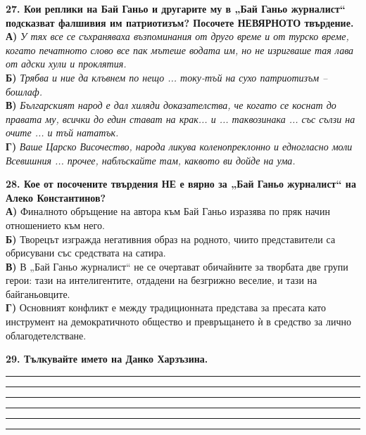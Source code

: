 \documentclass[12pt,a4paper]{article}
\begin{document}
{{{{{{{{{{{{\vspace{0.6cm}

\noindent
\textbf{27. Кои реплики на Бай Ганьо и другарите му в „Бай Ганьо журналист“ подсказват фалшивия им патриотизъм? Посочете НЕВЯРНОТО твърдение.} \\
\textbf{А)} \textit{У тях все се съхраняваха възпоминания от друго време и от турско време, когато печатното слово все пак мътеше водата им, но не изригваше тая лава от адски хули и проклятия.} \\
\textbf{Б)}  \textit{Трябва и ние да клъвнем по нещо ... току-тъй на сухо патриотизъм – бошлаф.} \\
\textbf{В)} \textit{Българският народ е дал хиляди доказателства, че когато се коснат до правата му, всички до един стават на крак... и ... таквозинака ... със сълзи на очите ... и тъй нататък.} \\
\textbf{Г)} \textit{Ваше Царско Височество, народа ликува коленопреклонно и едногласно моли Всевишния ... прочее, наблъскайте там, каквото ви дойде на ума.}

\vspace{0.6cm}

\noindent
\textbf{28. Кое от посочените твърдения НЕ е вярно за „Бай Ганьо журналист“ на Алеко Константинов?} \\
\textbf{А)} Финалното обръщение на автора към Бай Ганьо изразява по пряк начин отношението към него. \\
\textbf{Б)}  Творецът изгражда негативния образ на родното, чиито представители са обрисувани със средствата на сатира. \\
\textbf{В)} В „Бай Ганьо журналист“ не се очертават обичайните за творбата две групи герои: тази на интелигентите, отдадени на безгрижно веселие, и тази на байганьовците. \\
\textbf{Г)} Основният конфликт е между традиционната представа за пресата като инструмент на демократичното общество и превръщането ѝ в средство за лично облагодетелстване.  

\vspace{0.3cm}

\noindent
\textbf{29. Тълкувайте името на Данко Харзъзина.}

\vspace{0.3cm}

\noindent\rule{\linewidth}{0.4pt}
\noindent\rule{\linewidth}{0.4pt}
\noindent\rule{\linewidth}{0.4pt}
\noindent\rule{\linewidth}{0.4pt}
\noindent\rule{\linewidth}{0.4pt}
\noindent\rule{\linewidth}{0.4pt}

}}}}}}}}}}}}
\end{document}
